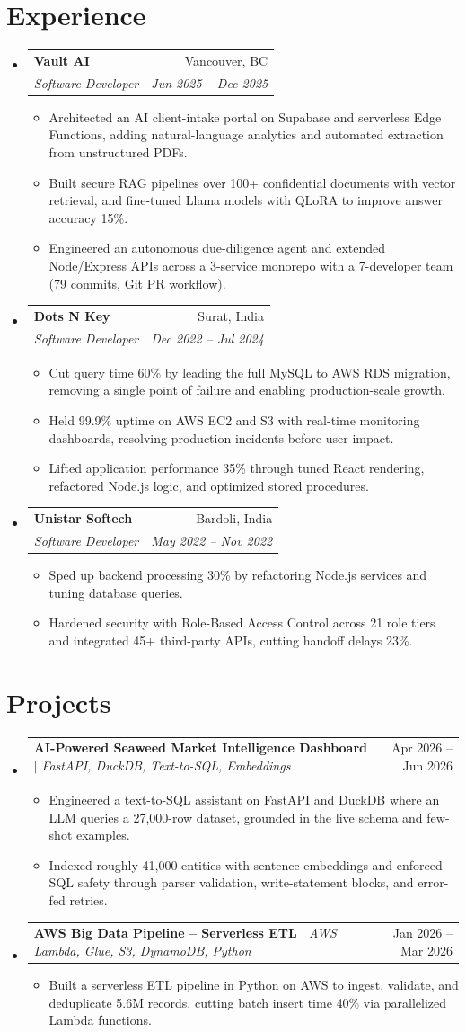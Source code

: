 \documentclass[letterpaper,11pt]{article}
\makeatletter
\newcommand{\resumeItem}[1]{
  \item\small{
    {#1 \vspace{-2pt}}
  }
}
\newcommand{\resumeSubheading}[4]{
  \vspace{-2pt}\item
    \begin{tabular*}{0.97\textwidth}[t]{l@{\extracolsep{\fill}}r}
      \textbf{#1} & #2 \\
      \textit{\small#3} & \textit{\small #4} \\
    \end{tabular*}\vspace{-7pt}
}
\newcommand{\resumeProjectHeading}[2]{
    \item
    \begin{tabular*}{0.97\textwidth}{@{\extracolsep{\fill}}p{0.78\textwidth} r@{}}
      \small #1 & \small #2 \\
    \end{tabular*}\vspace{-7pt}
}
\newcommand{\resumeSubHeadingListStart}{\begin{itemize}[leftmargin=0.15in, label={}]}
\newcommand{\resumeSubHeadingListEnd}{\end{itemize}}
\newcommand{\resumeItemListStart}{\begin{itemize}}
\newcommand{\resumeItemListEnd}{\end{itemize}\vspace{-5pt}}
\makeatother
\begin{document}
\section{Experience}
  \resumeSubHeadingListStart
    \resumeSubheading
      {Vault AI}{Vancouver, BC}
      {Software Developer}{Jun 2025 -- Dec 2025}
      \resumeItemListStart
        \resumeItem{Architected an AI client-intake portal on Supabase and serverless Edge Functions, adding natural-language analytics and automated extraction from unstructured PDFs.}
        \resumeItem{Built secure RAG pipelines over 100+ confidential documents with vector retrieval, and fine-tuned Llama models with QLoRA to improve answer accuracy 15\%.}
        \resumeItem{Engineered an autonomous due-diligence agent and extended Node/Express APIs across a 3-service monorepo with a 7-developer team (79 commits, Git PR workflow).}
      \resumeItemListEnd
    \resumeSubheading
      {Dots N Key}{Surat, India}
      {Software Developer}{Dec 2022 -- Jul 2024}
      \resumeItemListStart
        \resumeItem{Cut query time 60\% by leading the full MySQL to AWS RDS migration, removing a single point of failure and enabling production-scale growth.}
        \resumeItem{Held 99.9\% uptime on AWS EC2 and S3 with real-time monitoring dashboards, resolving production incidents before user impact.}
        \resumeItem{Lifted application performance 35\% through tuned React rendering, refactored Node.js logic, and optimized stored procedures.}
      \resumeItemListEnd
    \resumeSubheading
      {Unistar Softech}{Bardoli, India}
      {Software Developer}{May 2022 -- Nov 2022}
      \resumeItemListStart
        \resumeItem{Sped up backend processing 30\% by refactoring Node.js services and tuning database queries.}
        \resumeItem{Hardened security with Role-Based Access Control across 21 role tiers and integrated 45+ third-party APIs, cutting handoff delays 23\%.}
      \resumeItemListEnd
  \resumeSubHeadingListEnd

\section{Projects}
    \resumeSubHeadingListStart
      \resumeProjectHeading
          {\textbf{AI-Powered Seaweed Market Intelligence Dashboard} $|$ \emph{FastAPI, DuckDB, Text-to-SQL, Embeddings}}{Apr 2026 -- Jun 2026}
          \resumeItemListStart
            \resumeItem{Engineered a text-to-SQL assistant on FastAPI and DuckDB where an LLM queries a 27,000-row dataset, grounded in the live schema and few-shot examples.}
            \resumeItem{Indexed roughly 41,000 entities with sentence embeddings and enforced SQL safety through parser validation, write-statement blocks, and error-fed retries.}
          \resumeItemListEnd
      \resumeProjectHeading
          {\textbf{AWS Big Data Pipeline -- Serverless ETL} $|$ \emph{AWS Lambda, Glue, S3, DynamoDB, Python}}{Jan 2026 -- Mar 2026}
          \resumeItemListStart
            \resumeItem{Built a serverless ETL pipeline in Python on AWS to ingest, validate, and deduplicate 5.6M records, cutting batch insert time 40\% via parallelized Lambda functions.}
          \resumeItemListEnd
    \resumeSubHeadingListEnd
\end{document}
